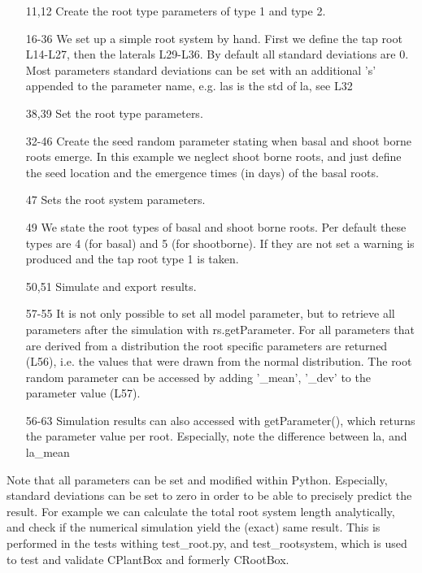 \begin{itemize}

\item[11,12] Create the root type parameters of type 1 and type 2.
\item[16-36] We set up a simple root system by hand. 
First we define the tap root L14-L27, then the laterals L29-L36. By default all standard deviations are 0. 
Most parameters standard deviations can be set with an additional 's' appended to the parameter name, 
e.g. las is the std of la, see L32
\item[38,39] Set the root type parameters.

\item[32-46] Create the seed random parameter stating when basal and shoot borne roots emerge. 
In this example we neglect shoot borne roots, and just define the seed location and  the emergence times (in days) 
of the basal roots.
\item[47] Sets the root system parameters.

\item[49] We state the root types of basal and shoot borne roots. 
Per default these types are 4 (for basal) and 5 (for shootborne). 
If they are not set a warning is produced and the tap root type 1 is taken. 
\item[50,51] Simulate and export results. 

\item[57-55] It is not only possible to set all model parameter, 
but to retrieve all parameters after the simulation with rs.getParameter. 
For all parameters that are derived from a distribution the root specific parameters are returned (L56), 
i.e. the values that were drawn from the normal distribution. 
The root random parameter can be accessed by adding '\_mean', '\_dev' to the parameter value (L57).  

\item[56-63] Simulation results can also accessed with getParameter(), 
which returns the parameter value per root. Especially, note the difference between la, and la\_mean

\end{itemize}

Note that all parameters can be set and modified within Python. 
Especially, standard deviations can be set to zero in order to be able to precisely predict the result. 
For example we can calculate the total root system length analytically, 
and check if the numerical simulation yield the (exact) same result. 
This is performed in the tests withing test\_root.py, and test\_rootsystem, 
which is used to test and validate CPlantBox and formerly CRootBox.



